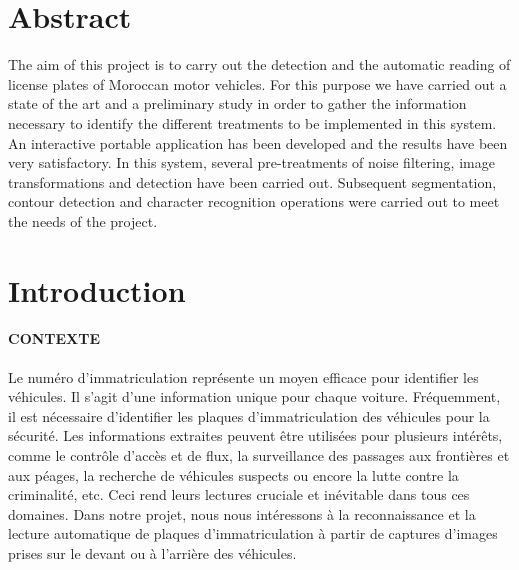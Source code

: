 \documentclass[11pt]{report}
\begin{document}
\chapter*{Abstract}
The aim of this project is to carry out the detection and the
automatic reading of license plates of Moroccan motor vehicles.
For this purpose we have carried out a state of the art and a
preliminary study in order to gather the information necessary to
identify the different treatments to be implemented in this
system. An interactive portable application
has been developed and the results have been very satisfactory.
In this system, several pre-treatments of noise filtering, image
transformations and detection have been carried out. Subsequent
segmentation, contour detection and character recognition
operations were carried out to meet the needs of the project.



\tableofcontents
\setcounter{tocdepth}{5}

\newpage
\listoffigures


\newpage
\sf
\chapter*{Introduction}
\subsubsection{CONTEXTE}
Le numéro d’immatriculation représente un moyen efficace pour identifier les véhicules. Il
s’agit d’une information unique pour chaque voiture.
Fréquemment, il est nécessaire d’identifier les plaques d’immatriculation des véhicules pour
la sécurité. Les informations extraites peuvent être utilisées pour plusieurs intérêts, comme
le contrôle d’accès et de flux, la surveillance des passages aux frontières et aux péages, la
recherche de véhicules suspects ou encore la lutte contre la criminalité, etc. Ceci rend leurs
lectures cruciale et inévitable dans tous ces domaines.
Dans notre projet, nous nous intéressons à la reconnaissance et la lecture automatique de
plaques d’immatriculation à partir de captures d’images prises sur le devant ou à l’arrière
des véhicules.
\end{document}
